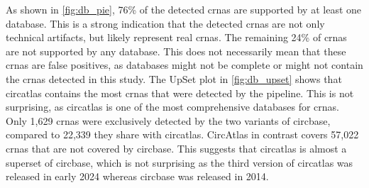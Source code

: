 As shown in \cref{fig:db_pie}, 76\% of the detected \glspl{crna} are supported
by at least one database.
This is a strong indication that the detected \glspl{crna} are not only
technical artifacts, but likely represent real \glspl{crna}.
The remaining 24\% of \glspl{crna} are not supported by any database.
This does not necessarily mean that these \glspl{crna} are false positives, as
databases might not be complete or might not contain the \glspl{crna} detected
in this study.
The UpSet plot in \cref{fig:db_upset} shows that \gls{circatlas} contains the
most \glspl{crna} that were detected by the pipeline.
This is not surprising, as \gls{circatlas} is one of the most comprehensive
databases for \glspl{crna}.
Only 1,629 \glspl{crna} were exclusively detected by the two variants of
\gls{circbase}, compared to 22,339 they share with \gls{circatlas}.
CircAtlas in contrast covers 57,022 \glspl{crna} that are not covered by
\gls{circbase}.
This suggests that \gls{circatlas} is almost a superset of \gls{circbase},
which is not surprising as the third version of \gls{circatlas} was released in
early 2024 whereas \gls{circbase} was released in
2014\supercite{glazar_circbase_2014,wu_circatlas_2023}.
